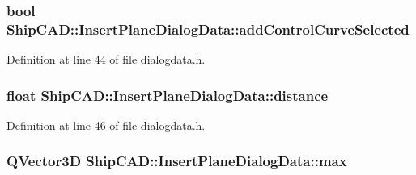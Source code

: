 \subsubsection[{\texorpdfstring{add\+Control\+Curve\+Selected}{addControlCurveSelected}}]{\setlength{\rightskip}{0pt plus 5cm}bool Ship\+C\+A\+D\+::\+Insert\+Plane\+Dialog\+Data\+::add\+Control\+Curve\+Selected}\hypertarget{structShipCAD_1_1InsertPlaneDialogData_a930de438c156597564b6ae33dcea03c3}{}\label{structShipCAD_1_1InsertPlaneDialogData_a930de438c156597564b6ae33dcea03c3}


Definition at line 44 of file dialogdata.\+h.

\subsubsection[{\texorpdfstring{distance}{distance}}]{\setlength{\rightskip}{0pt plus 5cm}float Ship\+C\+A\+D\+::\+Insert\+Plane\+Dialog\+Data\+::distance}\hypertarget{structShipCAD_1_1InsertPlaneDialogData_a73456e4622597dce48d16c05be358593}{}\label{structShipCAD_1_1InsertPlaneDialogData_a73456e4622597dce48d16c05be358593}


Definition at line 46 of file dialogdata.\+h.

\subsubsection[{\texorpdfstring{max}{max}}]{\setlength{\rightskip}{0pt plus 5cm}Q\+Vector3D Ship\+C\+A\+D\+::\+Insert\+Plane\+Dialog\+Data\+::max}\hypertarget{structShipCAD_1_1InsertPlaneDialogData_acef8dafcdd66649d8d0fa6fe6f8a7ea6}{}\label{structShipCAD_1_1InsertPlaneDialogData_acef8dafcdd66649d8d0fa6fe6f8a7ea6}


